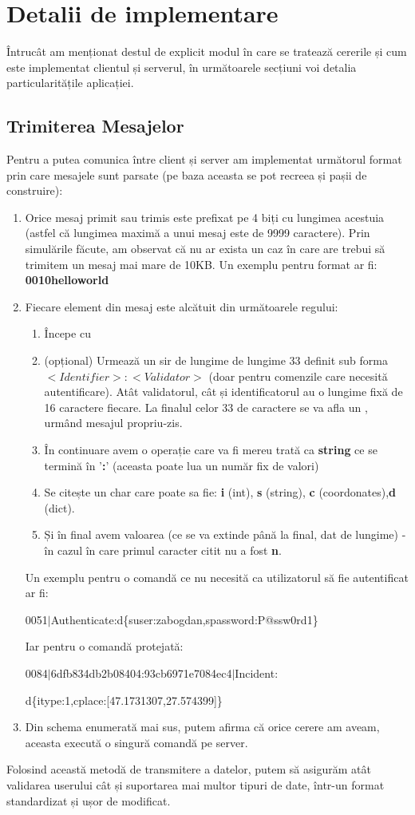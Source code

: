 \documentclass{article}
\begin{document}
\section{Detalii de implementare}
Întrucât am menționat destul de explicit modul în care se tratează cererile și cum este implementat clientul și serverul, în următoarele secțiuni voi detalia particularitățile aplicației.
\subsection{Trimiterea Mesajelor}
Pentru a putea comunica între client și server am implementat următorul format prin care mesajele sunt parsate (pe baza aceasta se pot recreea și pașii de construire):
\begin{enumerate}
    \item Orice mesaj primit sau trimis este prefixat pe 4 biți cu lungimea acestuia (astfel că lungimea maximă a unui mesaj este de 9999 caractere). Prin simulările făcute, am observat că nu ar exista un caz în care are trebui să trimitem un mesaj mai mare de 10KB. Un exemplu pentru format ar fi: \textbf{0010helloworld}
    \item Fiecare element din mesaj este alcătuit din următoarele regului: 
    \begin{enumerate}
        \item Începe cu \textbar 
        \item (opțional) Urmează un sir de lungime de lungime 33 definit sub forma \(<Identifier>:<Validator>\) (doar pentru comenzile care necesită autentificare). Atât validatorul, cât și identificatorul au o lungime fixă de 16 caractere fiecare. La finalul celor 33 de caractere se va afla un \textbar, urmând mesajul propriu-zis.
        \item În continuare avem o operație care va fi mereu trată ca \textbf{string} ce se termină în '\textbf{:}' (aceasta poate lua un număr fix de valori)
        \item Se citește un char care poate sa fie: 
         \textbf{i} (int), \textbf{s} (string), \textbf{c} (coordonates),\textbf{d} (dict).
        \item Și în final avem valoarea (ce se va extinde până la final, dat de lungime) - în cazul în care primul caracter citit nu a fost \textbf{n}.
    \end{enumerate}
    Un exemplu pentru o comandă ce nu necesită ca utilizatorul să fie autentificat ar fi: 
    
    0051\(\vert\)Authenticate:d\{suser:zabogdan,spassword:P@ssw0rd1\}

    Iar pentru o comandă protejată:

    0084\(\vert\)6dfb834db2b08404:93cb6971e7084ec4\(\vert\)Incident:

    d\{itype:1,cplace:[47.1731307,27.574399]\}

    \item Din schema enumerată mai sus, putem afirma că orice cerere am aveam, aceasta execută o singură comandă pe server.
\end{enumerate}
Folosind această metodă de transmitere a datelor, putem să asigurăm atât validarea userului cât și suportarea mai multor tipuri de date, într-un format standardizat și ușor de modificat.
\end{document}
